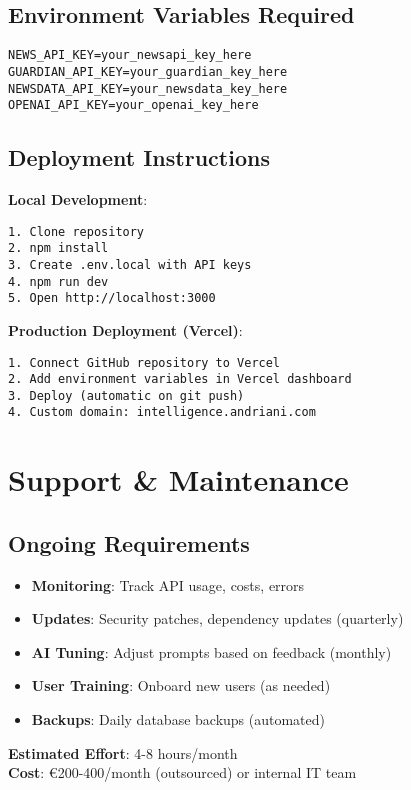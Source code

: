 \documentclass[11pt,a4paper]{article}
\begin{document}
\subsection{Environment Variables Required}
\begin{verbatim}
NEWS_API_KEY=your_newsapi_key_here
GUARDIAN_API_KEY=your_guardian_key_here
NEWSDATA_API_KEY=your_newsdata_key_here
OPENAI_API_KEY=your_openai_key_here
\end{verbatim}

\subsection{Deployment Instructions}

\textbf{Local Development}:
\begin{verbatim}
1. Clone repository
2. npm install
3. Create .env.local with API keys
4. npm run dev
5. Open http://localhost:3000
\end{verbatim}

\textbf{Production Deployment (Vercel)}:
\begin{verbatim}
1. Connect GitHub repository to Vercel
2. Add environment variables in Vercel dashboard
3. Deploy (automatic on git push)
4. Custom domain: intelligence.andriani.com
\end{verbatim}

\section{Support \& Maintenance}

\subsection{Ongoing Requirements}
\begin{itemize}[leftmargin=*]
    \item \textbf{Monitoring}: Track API usage, costs, errors
    \item \textbf{Updates}: Security patches, dependency updates (quarterly)
    \item \textbf{AI Tuning}: Adjust prompts based on feedback (monthly)
    \item \textbf{User Training}: Onboard new users (as needed)
    \item \textbf{Backups}: Daily database backups (automated)
\end{itemize}

\textbf{Estimated Effort}: 4-8 hours/month\\
\textbf{Cost}: \euro 200-400/month (outsourced) or internal IT team
\end{document}
